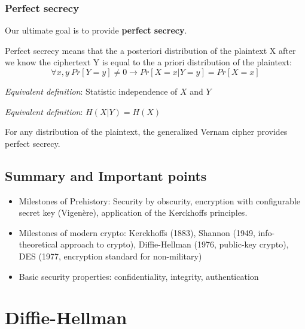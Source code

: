 \documentclass[11pt,a4paper]{article}
\begin{document}
\subsubsection{Perfect secrecy}
Our ultimate goal is to provide \textbf{perfect secrecy}.
\begin{definition}
    Perfect secrecy means that the a posteriori distribution of the plaintext X after we know the ciphertext Y is equal to the a priori distribution of the plaintext:
    \begin{equation}
        \forall x,y\ Pr[Y=y] \neq 0 \to Pr[X=x|Y=y] = Pr[X=x]
    \end{equation}

    \textit{Equivalent definition}: Statistic independence of $X$ and $Y$

    \textit{Equivalent definition}: $H(X|Y) = H(X)$
\end{definition}

For any distribution of the plaintext, the generalized Vernam cipher provides perfect secrecy.


\subsection{Summary and Important points}
\begin{itemize}
    \item Milestones of Prehistory: Security by obscurity, encryption with configurable secret key (Vigenère), application of the Kerckhoffs principles.
    \item Milestones of modern crypto: Kerckhoffs (1883), Shannon (1949, info-theoretical approach to crypto), Diffie-Hellman (1976, public-key crypto), DES (1977, encryption standard for non-military)
    \item Basic security properties: confidentiality, integrity, authentication
\end{itemize}



\section{Diffie-Hellman}
\label{sec:diffie-hellman}
\end{document}
